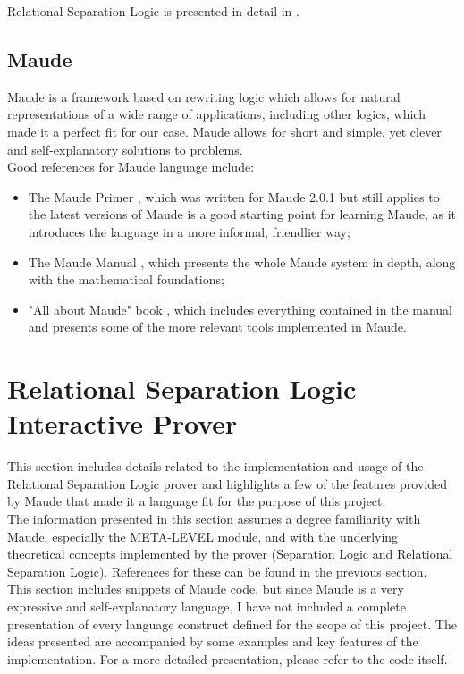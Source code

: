 \documentclass[12pt,a4paper]{article}
\begin{document}
Relational Separation Logic is presented in detail in \cite{relational}.
\subsection{Maude}
Maude \cite{maudesite} is a framework based on rewriting logic \cite{rewritingLogic} which allows for natural representations of a wide range of applications, including other logics, which made it a perfect fit for our case. Maude allows for short and simple, yet clever and self-explanatory solutions to problems. 
\\

 Good references for Maude language include:
 \begin{itemize}
 	\item The Maude Primer \cite{primer}, which was written for Maude 2.0.1 but still applies to the latest versions of Maude is a good starting point for learning Maude, as it introduces the language in a more informal, friendlier way;
 	\item The Maude Manual \cite{manual}, which presents the whole Maude system in depth, along with the mathematical foundations;
 	\item "All about Maude" book \cite{allAboutMaude}, which includes everything contained in the manual and presents some of the more relevant tools implemented in Maude.
 \end{itemize}
\section{Relational Separation Logic Interactive Prover} 
This section includes details related to the implementation and usage of the Relational Separation Logic prover and highlights a few of the features provided by Maude that made it a language fit for the purpose of this project.
\\

The information presented in this section assumes a degree familiarity with Maude, especially the META-LEVEL module, and with the underlying theoretical concepts implemented by the prover (Separation Logic and Relational Separation Logic). References for these can be found in the previous section.
\\

This section includes snippets of Maude code, but since Maude is a very expressive and self-explanatory language, I have not included a complete presentation of every language construct defined for the scope of this project. The ideas presented are accompanied by some examples and key features of the implementation. For a more detailed presentation, please refer to the code itself.
\end{document}
